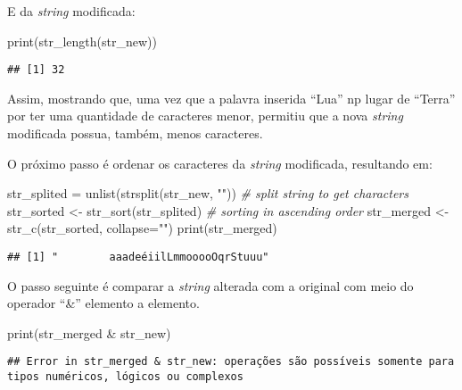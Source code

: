 \documentclass[
]{article}
\newenvironment{Shaded}{\begin{snugshade}}{\end{snugshade}}
\newcommand{\AttributeTok}[1]{\textcolor[rgb]{0.77,0.63,0.00}{#1}}
\newcommand{\CommentTok}[1]{\textcolor[rgb]{0.56,0.35,0.01}{\textit{#1}}}
\newcommand{\FunctionTok}[1]{\textcolor[rgb]{0.00,0.00,0.00}{#1}}
\newcommand{\NormalTok}[1]{#1}
\newcommand{\OtherTok}[1]{\textcolor[rgb]{0.56,0.35,0.01}{#1}}
\newcommand{\SpecialCharTok}[1]{\textcolor[rgb]{0.00,0.00,0.00}{#1}}
\newcommand{\StringTok}[1]{\textcolor[rgb]{0.31,0.60,0.02}{#1}}
\begin{document}
E da \emph{string} modificada:

\begin{Shaded}
\begin{Highlighting}[]
\FunctionTok{print}\NormalTok{(}\FunctionTok{str\_length}\NormalTok{(str\_new))}
\end{Highlighting}
\end{Shaded}

\begin{verbatim}
## [1] 32
\end{verbatim}

Assim, mostrando que, uma vez que a palavra inserida ``Lua'' np lugar de
``Terra'' por ter uma quantidade de caracteres menor, permitiu que a
nova \emph{string} modificada possua, também, menos caracteres.

O próximo passo é ordenar os caracteres da \emph{string} modificada,
resultando em:

\begin{Shaded}
\begin{Highlighting}[]
\NormalTok{str\_splited }\OtherTok{=} \FunctionTok{unlist}\NormalTok{(}\FunctionTok{strsplit}\NormalTok{(str\_new, }\StringTok{""}\NormalTok{)) }\CommentTok{\# split string to get characters}
\NormalTok{str\_sorted }\OtherTok{\textless{}{-}} \FunctionTok{str\_sort}\NormalTok{(str\_splited) }\CommentTok{\# sorting in ascending order}
\NormalTok{str\_merged }\OtherTok{\textless{}{-}} \FunctionTok{str\_c}\NormalTok{(str\_sorted, }\AttributeTok{collapse=}\StringTok{""}\NormalTok{)}
\FunctionTok{print}\NormalTok{(str\_merged)}
\end{Highlighting}
\end{Shaded}

\begin{verbatim}
## [1] "        aaadeéiilLmmooooOqrStuuu"
\end{verbatim}

O passo seguinte é comparar a \emph{string} alterada com a original com
meio do operador ``\&'' elemento a elemento.

\begin{Shaded}
\begin{Highlighting}[]
\FunctionTok{print}\NormalTok{(str\_merged }\SpecialCharTok{\&}\NormalTok{ str\_new)}
\end{Highlighting}
\end{Shaded}

\begin{verbatim}
## Error in str_merged & str_new: operações são possíveis somente para tipos numéricos, lógicos ou complexos
\end{verbatim}
\end{document}
